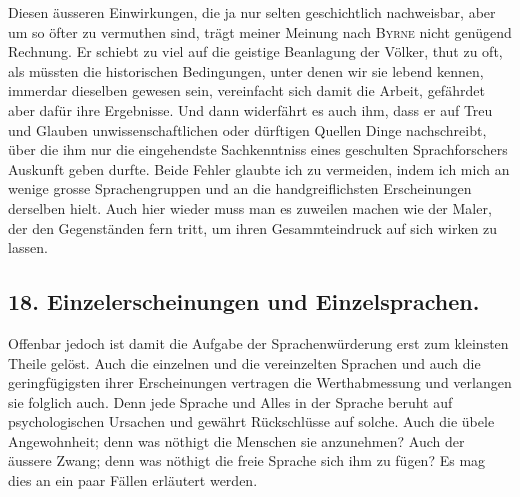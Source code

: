 Diesen äusseren Einwirkungen, die ja nur selten geschichtlich nach\label{fp.406}weisbar, aber um so öfter zu vermuthen sind, trägt meiner Meinung nach \textsc{Byrne} nicht genügend Rechnung. Er schiebt zu viel auf die geistige Beanlagung der Völker, thut zu oft, als müssten die historischen Bedingungen, unter denen wir sie lebend kennen, immerdar dieselben gewesen sein, vereinfacht sich damit die Arbeit, gefährdet aber dafür ihre Ergebnisse. Und dann widerfährt es auch ihm, dass er auf Treu und Glauben unwissenschaftlichen oder dürftigen Quellen Dinge nachschreibt, über die ihm nur die eingehendste Sachkenntniss eines geschulten Sprachforschers Auskunft geben durfte. Beide Fehler glaubte ich zu vermeiden, indem ich mich an wenige grosse Sprachengruppen und an die handgreiflichsten Erscheinungen derselben hielt. Auch hier wieder muss man es zuweilen machen wie der Maler, der den Gegenständen fern tritt, um ihren Gesammteindruck auf sich wirken zu lassen.

\clearpage{}
\subsection*{18. Einzelerscheinungen und Einzelsprachen.}\label{IV.IV.18}

Offenbar jedoch ist damit die Aufgabe der Sprachenwürderung erst zum kleinsten Theile gelöst. Auch die einzelnen und die vereinzelten Sprachen und auch die geringfügigsten ihrer Erscheinungen vertragen die Werthabmessung und verlangen sie folglich auch. Denn jede Sprache und Alles in der Sprache beruht auf psychologischen Ursachen und gewährt Rückschlüsse auf solche. \label{sp.428} Auch die übele Angewohnheit; denn was nöthigt die Menschen sie anzunehmen? Auch der äussere Zwang; denn was nöthigt die freie Sprache sich ihm zu fügen? Es mag dies an ein paar Fällen erläutert werden.

